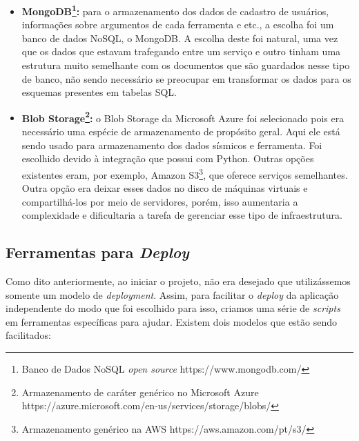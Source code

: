 \documentclass[11pt,twoside]{article}
\begin{document}
\begin{itemize}
  \item \textbf{MongoDB\footnote{Banco de Dados NoSQL \emph{open source} https://www.mongodb.com/}:} para o armazenamento dos dados de cadastro de usuários, informações sobre argumentos de cada ferramenta e etc., a escolha foi um banco de dados NoSQL, o MongoDB. A escolha deste
  foi natural, uma vez que os dados que estavam trafegando entre um serviço e outro tinham uma estrutura muito semelhante com os documentos que são guardados nesse tipo de banco, não sendo necessário se preocupar
  em transformar os dados para os esquemas presentes em tabelas SQL.

  \item \textbf{Blob Storage\footnote{Armazenamento de caráter genérico no Microsoft Azure https://azure.microsoft.com/en-us/services/storage/blobs/}:} o Blob Storage da Microsoft Azure foi selecionado pois era necessário uma espécie de armazenamento de propósito geral. Aqui ele está sendo usado para armazenamento dos dados sísmicos e
  ferramenta. Foi escolhido devido à integração que possui com Python. Outras opções existentes eram, por exemplo, Amazon S3\footnote{Armazenamento genérico na AWS https://aws.amazon.com/pt/s3/}, que oferece serviços semelhantes. Outra opção era deixar esses dados 
  no disco de máquinas virtuais e compartilhá-los por meio de servidores, porém, isso aumentaria a complexidade e dificultaria a tarefa de gerenciar esse tipo de infraestrutura.
\end{itemize}

\subsection{Ferramentas para \emph{Deploy}}

Como dito anteriormente, ao iniciar o projeto, não era desejado que utilizássemos somente um modelo de \emph{deployment}. Assim, para facilitar o \emph{deploy} da aplicação independente
do modo que foi escolhido para isso, criamos uma série de \emph{scripts} em ferramentas específicas para ajudar. Existem dois modelos que estão sendo facilitados:
\end{document}

